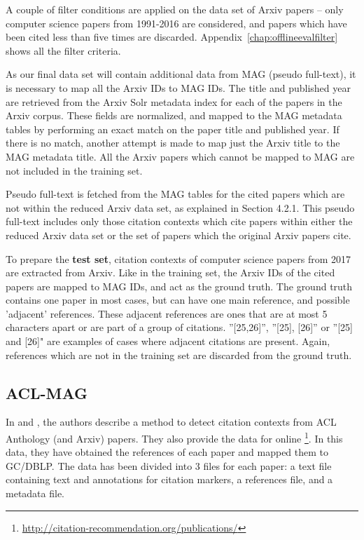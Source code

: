 A couple of filter conditions are applied on the data set of Arxiv papers -- only computer science papers from 1991-2016 are considered, and papers which have been cited less than five times are discarded. Appendix~\ref{chap:offlineevalfilter} shows all the filter criteria.

As our final data set will contain additional data from MAG (pseudo full-text), it is necessary to map all the Arxiv IDs to MAG IDs. The title and published year are retrieved from the Arxiv Solr metadata index for each of the papers in the Arxiv corpus. These fields are normalized, and mapped to the MAG metadata tables by performing an exact match on the paper title and published year. If there is no match, another attempt is made to map just the Arxiv title to the MAG metadata title. All the Arxiv papers which cannot be mapped to MAG are not included in the training set. 

Pseudo full-text is fetched from the MAG tables for the cited papers which are not within the reduced Arxiv data set, as explained in Section 4.2.1. This pseudo full-text includes only those citation contexts which cite papers within either the reduced Arxiv data set or the set of papers which the original Arxiv papers cite.

To prepare the \textbf{test set}, citation contexts of computer science papers from 2017 are extracted from Arxiv. Like in the training set, the Arxiv IDs of the cited papers are mapped to MAG IDs, and act as the ground truth. The ground truth contains one paper in most cases, but can have one main reference, and possible 'adjacent' references. These adjacent references are ones that are at most 5 characters apart or are part of a group of citations. ”[25,26]”, ”[25], [26]” or ”[25] and [26]" are examples of cases where adjacent citations are present. Again, references which are not in the training set are discarded from the ground truth.  
\subsection{ACL-MAG}
In \cite{Faerber2018b} and \cite{Faerber2018}, the authors describe a method to detect citation contexts from ACL Anthology (and Arxiv) papers. They also provide the data for \cite{Faerber2018b} online \footnote{\url{http://citation-recommendation.org/publications/}}. In this data, they have obtained the references of each paper and mapped them to GC/DBLP.  The data has been divided into 3 files for each paper: a text file containing text and annotations for citation markers, a references file, and a metadata file. 

